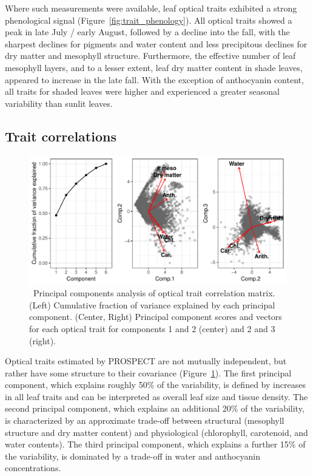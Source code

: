 Where such measurements were available, leaf optical traits exhibited a strong phenological signal (Figure~\ref{fig:trait_phenology}).
All optical traits showed a peak in late July / early August, followed by a decline into the fall, with the sharpest declines for pigments and water content and less precipitous declines for dry matter and mesophyll structure.
Furthermore, the effective number of leaf mesophyll layers, and to a lesser extent, leaf dry matter content in shade leaves, appeared to increase in the late fall.
With the exception of anthocyanin content, all traits for shaded leaves were higher and experienced a greater seasonal variability than sunlit leaves.

\subsection{Trait correlations}

\begin{figure}
  \includegraphics[width=\textwidth]{figures/prospect_pca.pdf}
  \caption{\
    Principal components analysis of optical trait correlation matrix. 
    (Left) Cumulative fraction of variance explained by each principal component.
    (Center, Right) Principal component scores and vectors for each optical trait for components 1 and 2 (center) and 2 and 3 (right).
  }\label{fig:prospect_pca}
\end{figure}

Optical traits estimated by PROSPECT are not mutually independent, but rather have some structure to their covariance (Figure~\ref{fig:prospect_pca}).
The first principal component, which explains roughly 50\% of the variability, is defined by increases in all leaf traits and can be interpreted as overall leaf size and tissue density.
The second principal component, which explains an additional 20\% of the variability, is characterized by an approximate trade-off between structural (mesophyll structure and dry matter content) and physiological (chlorophyll, carotenoid, and water contents).
The third principal component, which explains a further 15\% of the variability, is dominated by a trade-off in water and anthocyanin concentrations.

